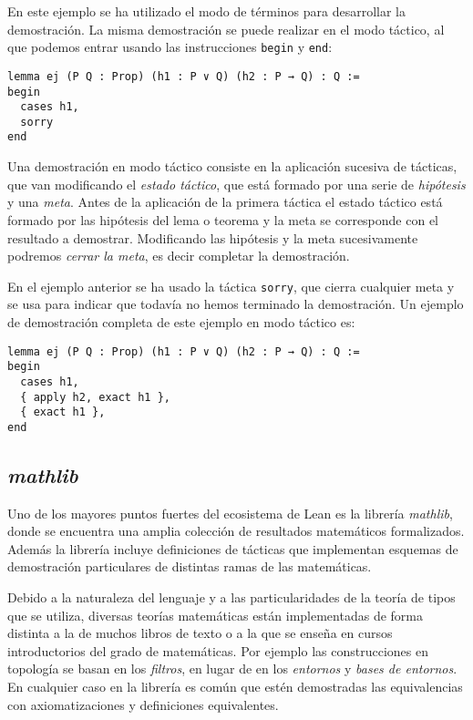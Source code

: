 En este ejemplo se ha utilizado el modo de términos para desarrollar la
demostración. La misma demostración se puede realizar en el modo táctico, al que
podemos entrar usando las instrucciones \lstinline{begin} y \lstinline{end}:

\begin{lstlisting}
lemma ej (P Q : Prop) (h1 : P ∨ Q) (h2 : P → Q) : Q :=
begin
  cases h1,
  sorry
end
\end{lstlisting}

Una demostración en modo táctico consiste en la aplicación sucesiva de tácticas,
que van modificando el \textit{estado táctico}, que está formado por una serie
de \textit{hipótesis} y una \textit{meta}. Antes de la aplicación de la primera
táctica el estado táctico está formado por las hipótesis del lema o teorema y la
meta se corresponde con el resultado a demostrar. Modificando las hipótesis y la
meta sucesivamente podremos \textit{cerrar la meta}, es decir completar la
demostración.

En el ejemplo anterior se ha usado la táctica \lstinline{sorry}, que cierra
cualquier meta y se usa para indicar que todavía no hemos terminado la
demostración. Un ejemplo de demostración completa de este ejemplo en modo
táctico es:

\begin{lstlisting}
lemma ej (P Q : Prop) (h1 : P ∨ Q) (h2 : P → Q) : Q :=
begin
  cases h1,
  { apply h2, exact h1 },
  { exact h1 },
end
\end{lstlisting}

\subsection{\textit{mathlib}}

Uno de los mayores puntos fuertes del ecosistema de Lean es la librería
\textit{mathlib}, donde se encuentra una amplia colección de resultados
matemáticos formalizados. Además la librería incluye definiciones de tácticas
que implementan esquemas de demostración particulares de distintas ramas de las
matemáticas.

Debido a la naturaleza del lenguaje y a las particularidades de la teoría de
tipos que se utiliza, diversas teorías matemáticas están implementadas de forma
distinta a la de muchos libros de texto o a la que se enseña en cursos introductorios
del grado de matemáticas. Por ejemplo las construcciones en topología se
basan en los \textit{filtros}, en lugar de en los \textit{entornos} y
\textit{bases de entornos}. En cualquier caso en la librería es común que estén
demostradas las equivalencias con axiomatizaciones y definiciones equivalentes.











